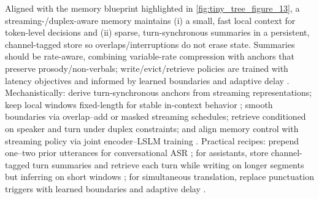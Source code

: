 \documentclass{article}
\begin{document}
Aligned with the memory blueprint highlighted in \autoref{fig:tiny_tree_figure_13}, a streaming-/duplex-aware memory maintains (i) a small, fast local context for token-level decisions and (ii) sparse, turn-synchronous summaries in a persistent, channel-tagged store so overlaps/interruptions do not erase state. Summaries should be rate-aware, combining variable-rate compression with anchors that preserve prosody/non-verbals; write/evict/retrieve policies are trained with latency objectives and informed by learned boundaries and adaptive delay \cite{guo2025streamuniachievingstreamingspeechtransla}. Mechanistically: derive turn-synchronous anchors from streaming representations; keep local windows fixed-length for stable in-context behavior \cite{hsu2024exploringcontextlearningtextlessspeechla}; smooth boundaries via overlap--add or masked streaming schedules; retrieve conditioned on speaker and turn under duplex constraints; and align memory control with streaming policy via joint encoder--LSLM training \cite{guo2025streamuniachievingstreamingspeechtransla}. Practical recipes: prepend one--two prior utterances for conversational ASR \cite{li2025seewossubmissionmlcslmlessonslearnedspee}; for assistants, store channel-tagged turn summaries and retrieve each turn while writing on longer segments but inferring on short windows \cite{nguyen2025qwenvsgemmaintegrationwhispercomparative}; for simultaneous translation, replace punctuation triggers with learned boundaries and adaptive delay \cite{guo2025streamuniachievingstreamingspeechtransla}.
\end{document}
